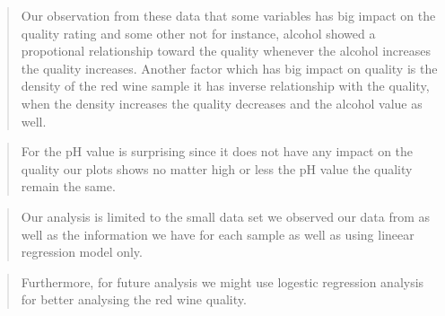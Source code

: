 \documentclass[]{article}
\begin{document}
\begin{quote}
Our observation from these data that some variables has big impact on
the quality rating and some other not for instance, alcohol showed a
propotional relationship toward the quality whenever the alcohol
increases the quality increases. Another factor which has big impact on
quality is the density of the red wine sample it has inverse
relationship with the quality, when the density increases the quality
decreases and the alcohol value as well.
\end{quote}

\begin{quote}
For the pH value is surprising since it does not have any impact on the
quality our plots shows no matter high or less the pH value the quality
remain the same.
\end{quote}

\begin{quote}
Our analysis is limited to the small data set we observed our data from
as well as the information we have for each sample as well as using
lineear regression model only.
\end{quote}

\begin{quote}
Furthermore, for future analysis we might use logestic regression
analysis for better analysing the red wine quality.
\end{quote}
\end{document}
